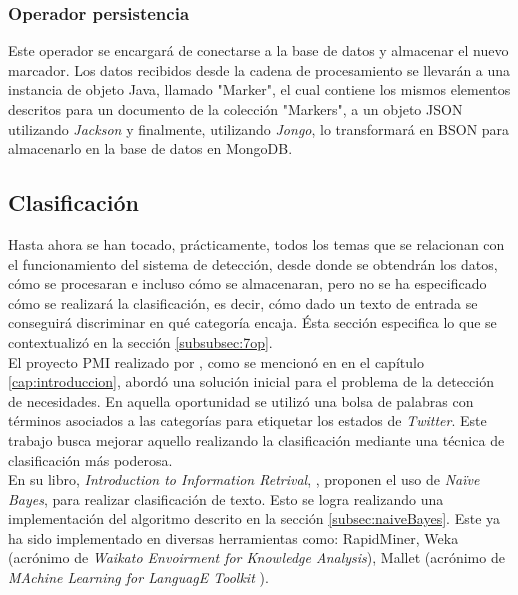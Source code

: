 \subsubsection{Operador persistencia}
\label{subsubsec:8op}

Este operador se encargará de conectarse a la base de datos y almacenar el nuevo marcador. Los datos recibidos desde la cadena de procesamiento se llevarán a una instancia de objeto Java, llamado "Marker", el cual contiene los mismos elementos descritos para un documento de la colección "Markers", a un objeto JSON utilizando \textit{Jackson} y finalmente, utilizando \textit{Jongo}, lo transformará en BSON para almacenarlo en la base de datos en MongoDB.

\subsection{Clasificación}
\label{subsec:clasificacion}

Hasta ahora se han tocado, prácticamente, todos los temas que se relacionan con el funcionamiento del sistema de detección, desde donde se obtendrán los datos, cómo se procesaran e incluso cómo se almacenaran, pero no se ha especificado cómo se realizará la clasificación, es decir, cómo dado un texto de entrada se conseguirá discriminar en qué categoría encaja. Ésta sección especifica lo que se contextualizó en la sección \ref{subsubsec:7op}.\\

El proyecto PMI realizado por \cite{WladdimiroPMI}, como se mencionó en en el capítulo \ref{cap:introduccion}, abordó una solución inicial para el problema de la detección de necesidades. En aquella oportunidad se utilizó una bolsa de palabras con términos asociados a las categorías para etiquetar los estados de \textit{Twitter}. Este trabajo busca mejorar aquello realizando la clasificación mediante una técnica de clasificación más poderosa.\\

En su libro, \textit{Introduction to Information Retrival}, \cite{IRQE}, proponen el uso de \textit{Naïve Bayes}, para realizar clasificación de texto. Esto se logra realizando una implementación del algoritmo descrito en la sección \ref{subsec:naiveBayes}. Este ya ha sido implementado en diversas herramientas como: RapidMiner, Weka (acrónimo de \textit{Waikato Envoirment for Knowledge Analysis}), Mallet (acrónimo de \textit{MAchine Learning for LanguagE Toolkit }).\\ 


